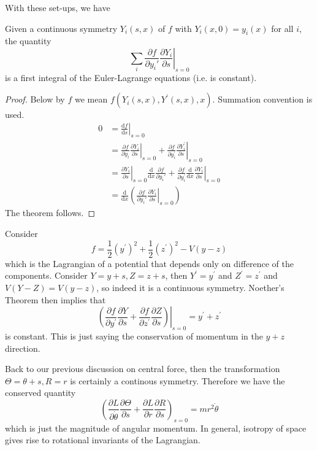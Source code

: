 \documentclass{article}
\begin{document}
With these set-ups, we have
\begin{theorem}
    Given a continuous symmetry $Y_i(s,x)$ of $f$ with $Y_i(x,0)=y_i(x)$ for all $i$, the quantity
    $$\sum_i\frac{\partial f}{\partial y_i'}\left.\frac{\partial Y_i}{\partial s}\right|_{s=0}$$
    is a first integral of the Euler-Lagrange equations (i.e. is constant).
\end{theorem}
\begin{proof}
    Below by $f$ we mean $f(Y_i(s,x),Y^\prime(s,x),x)$.
    Summation convention is used.
    \begin{align*}
        0&=\left.\frac{\mathrm df}{\mathrm ds}\right|_{s=0}\\
        &=\frac{\partial f}{\partial y_i}\left.\frac{\partial Y_i}{\partial s}\right|_{s=0}+\frac{\partial f}{\partial y_i^\prime}\left.\frac{\partial Y_i^\prime}{\partial s}\right|_{s=0}\\
        &=\left.\frac{\partial Y_i}{\partial s}\right|_{s=0}\frac{\mathrm d}{\mathrm dx}\frac{\partial f}{\partial y_i'}+\frac{\partial f}{\partial y_i^\prime}\left.\frac{\mathrm d}{\mathrm dx}\frac{\partial Y_i}{\partial s}\right|_{s=0}\\
        &=\frac{\mathrm d}{\mathrm dx}\left( \frac{\partial f}{\partial y_i'}\left.\frac{\partial Y_i}{\partial s}\right|_{s=0} \right)
    \end{align*}
    The theorem follows.
\end{proof}
\begin{example}
    Consider
    $$f=\frac{1}{2}(y^\prime)^2+\frac{1}{2}(z^\prime)^2-V(y-z)$$
    which is the Lagrangian of a potential that depends only on difference of the components.
    Consider $Y=y+s, Z=z+s$, then $Y^\prime=y^\prime$ and $Z^\prime=z^\prime$ and $V(Y-Z)=V(y-z)$, so indeed it is a continuous symmetry.
    Noether's Theorem then implies that
    $$\left.\left( \frac{\partial f}{\partial y^\prime}\frac{\partial Y}{\partial s}+\frac{\partial f}{\partial z^\prime}\frac{\partial Z}{\partial s} \right)\right|_{s=0}=y^\prime+z^\prime$$
    is constant.
    This is just saying the conservation of momentum in the $y+z$ direction.
\end{example}
\begin{example}
    Back to our previous discussion on central force, then the transformation $\Theta=\theta+s,R=r$ is certainly a continous symmetry.
    Therefore we have the conserved quantity
    $$\left( \frac{\partial L}{\partial\dot{\theta}}\frac{\partial\Theta}{\partial s}+\frac{\partial L}{\partial\dot{r}}\frac{\partial R}{\partial s} \right)_{s=0}=mr^2\dot{\theta}$$
    which is just the magnitude of angular momentum.
    In general, isotropy of space gives rise to rotational invariants of the Lagrangian.
\end{example}
\end{document}
